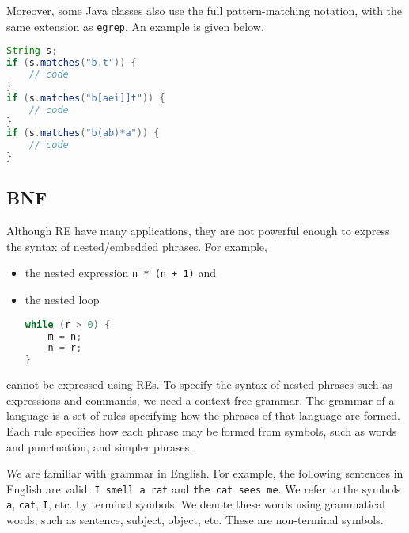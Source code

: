 \documentclass[a4paper, openany]{memoir}
\begin{document}
Moreover, some Java classes also use the full pattern-matching notation, with the same extension as \texttt{egrep}. An example is given below.
\begin{lstlisting}[language=java]
String s;
if (s.matches("b.t")) {
    // code
}
if (s.matches("b[aei]]t")) {
    // code
}
if (s.matches("b(ab)*a")) {
    // code
}
\end{lstlisting}

\subsection{BNF}
Although RE have many applications, they are not powerful enough to express the syntax of nested/embedded phrases. For example,
\begin{itemize}
    \item the nested expression \texttt{n * (n + 1)} and
    \item the nested loop 
\begin{lstlisting}[language=java]
while (r > 0) {
    m = n;
    n = r;
}
\end{lstlisting}
\end{itemize}
cannot be expressed using REs. To specify the syntax of nested phrases such as expressions and commands, we need a context-free grammar. The grammar of a language is a set of rules specifying how the phrases of that language are formed. Each rule specifies how each phrase may be formed from symbols, such as words and punctuation, and simpler phrases.

We are familiar with grammar in English. For example, the following sentences in English are valid: \texttt{I smell a rat} and \texttt{the cat sees me}. We refer to the symbols \texttt{a}, \texttt{cat}, \texttt{I}, etc. by terminal symbols. We denote these words using grammatical words, such as sentence, subject, object, etc. These are non-terminal symbols.
\end{document}

